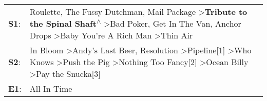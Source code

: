 \begin{supertabular}{p{0.03\textwidth}p{0.92\textwidth}}
 \textbf{S1}:  &     Roulette\textsuperscript{}, \enspace The Fussy Dutchman\textsuperscript{}, \enspace Mail Package\textsuperscript{} \textgreater \enspace \textbf{Tribute to the Spinal Shaft\textsuperscript{$\wedge$}} \textgreater \enspace Bad Poker\textsuperscript{}, \enspace Get In The Van\textsuperscript{}, \enspace Anchor Drops\textsuperscript{} \textgreater \enspace Baby You're A Rich Man\textsuperscript{} \textgreater \enspace Thin Air\textsuperscript{}  \enspace  \\
 \textbf{S2}:  &  In Bloom\textsuperscript{} \textgreater \enspace Andy's Last Beer\textsuperscript{}, \enspace Resolution\textsuperscript{} \textgreater \enspace Pipeline[1]\textsuperscript{} \textgreater \enspace Who Knows\textsuperscript{} \textgreater \enspace Push the Pig\textsuperscript{} \textgreater \enspace Nothing Too Fancy[2]\textsuperscript{} \textgreater \enspace Ocean Billy\textsuperscript{} \textgreater \enspace Pay the Snucka[3]\textsuperscript{}  \enspace  \\
 \textbf{E1}:  &                                                                                                                                                                                                                                                                                                                                                                                                                                     All In Time\textsuperscript{}  \enspace  \\
\end{supertabular}
